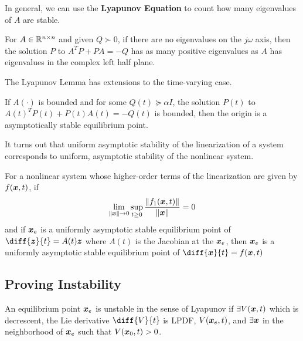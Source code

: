 In general, we can use the \textbf{Lyapunov Equation} to count how many
eigenvalues of $A$ are stable.
\begin{theorem}
	For $A\in\mathbb{R}^{n\times n}$ and given $Q \succ 0$, if there are no eigenvalues on
	the $j\omega$ axis, then the solution $P$ to $A^TP + PA = -Q$ has as many
	positive eigenvalues as $A$ has eigenvalues in the complex left half plane.
	\label{thm:tausskey-lemma}
\end{theorem}
The Lyapunov Lemma has extensions to the time-varying case.
\begin{theorem}
	If $A(\cdot)$ is bounded and for some $Q(t) \succeq \alpha I$, the solution
	$P(t)$ to $A(t)^TP(t) + P(t)A(t) = -Q(t)$ is bounded, then the origin is a
	asymptotically stable equilibrium point.
	\label{thm:tv-lyapuynov-lemma}
\end{theorem}
It turns out that uniform asymptotic stability of the linearization of a system
corresponds to uniform, asymptotic stability of the nonlinear system.
\begin{theorem}
	For a nonlinear system whose higher-order terms of the linearization are given
	by $f(\boldsymbol{x},t)$, if \[
		\lim_{\|\boldsymbol{x}\|\to 0}\sup_{t\geq 0} \frac{\|f_1(\boldsymbol{x},t)\|}{\|\boldsymbol{x}\|} =
		0
	\]
	and if $\boldsymbol{x}_e$ is a uniformly asymptotic stable equilibrium point of
	$\diff{\bs{z}}{t}=A(t)\bs{z}$ where $A(t)$ is the Jacobian at the $\boldsymbol{x}_e$,
	then $\boldsymbol{x}_e$ is a uniformly asymptotic stable
	equilibrium point of $\diff{\bs{x}}{t} = f(\bs{x},t)$
	\label{thm:indirect-lyapunov}
\end{theorem}
\subsection{Proving Instability}
\begin{theorem}
	An equilibrium point $\boldsymbol{x}_e$ is unstable in the sense of Lyapunov if
	$\exists V(\boldsymbol{x},t)$ which is decrescent, the Lie derivative $\diff{V}{t}$ is
	LPDF, $V(\boldsymbol{x}_e, t)$, and $\exists \boldsymbol{x}$ in the neighborhood of $\boldsymbol{x}_e$
	such that $V(\boldsymbol{x}_0, t) > 0$.
	\label{thm:lyapunov-instability}
\end{theorem}
